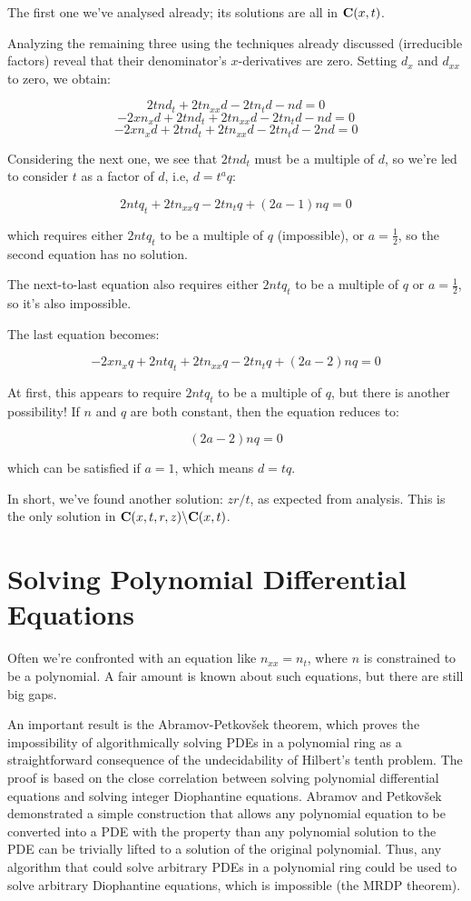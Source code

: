\documentclass{article}
\newcommand{\C}{\ensuremath{{\bf C}}}
\begin{document}
The first one we've analysed already; its solutions are all in $\C(x,t)$.

Analyzing the remaining three using the techniques already discussed
(irreducible factors) reveal that their denominator's $x$-derivatives
are zero.  Setting $d_x$ and $d_{xx}$ to zero, we obtain:

$$2tnd_t +2tn_{xx}d -2tn_td -nd = 0$$
$$-2xn_xd +2tnd_t +2tn_{xx}d -2tn_td -nd = 0$$
$$-2xn_xd +2tnd_t +2tn_{xx}d -2tn_td -2nd = 0$$

Considering the next one, we see that $2tnd_t$ must be a multiple of $d$, so we're led to
consider $t$ as a factor of $d$, i.e, $d=t^a q$:

$$2nt q_t + 2tn_{xx}q -2tn_tq +(2a-1)nq = 0$$

which requires either $2ntq_t$ to be a multiple of $q$ (impossible), or $a=\frac{1}{2}$,
so the second equation has no solution.

The next-to-last equation also requires either $2ntq_t$ to be a multiple of $q$ or $a=\frac{1}{2}$, so it's also impossible.

The last equation becomes:


$$-2xn_xq  + 2 n t q_t +2tn_{xx}q -2tn_tq +(2a-2)nq = 0$$

At first, this appears to require $2ntq_t$ to be a multiple of $q$, but there is another possibility!
If $n$ and $q$ are both constant, then the equation reduces to:

$$(2a-2)nq = 0$$

which can be satisfied if $a=1$, which means $d=tq$.

In short, we've found another solution: $zr/t$, as expected from analysis.
This is the only solution in $\C(x,t,r,z) \backslash \C(x,t)$.

\vfill\eject

\section*{Solving Polynomial Differential Equations}

Often we're confronted with an equation like $n_{xx} = n_t$, where $n$
is constrained to be a polynomial.  A fair amount is known about
such equations, but there are still big gaps.

An important result is the Abramov-Petkov\v sek theorem, which proves
the impossibility of algorithmically solving PDEs in a polynomial ring
as a straightforward consequence of the undecidability of Hilbert's
tenth problem.  The proof is based on the close correlation between
solving polynomial differential equations and solving integer Diophantine
equations.  Abramov and Petkov\v sek demonstrated a simple
construction that allows any polynomial equation to be converted
into a PDE with the property than any polynomial solution to the PDE
can be trivially lifted to a solution of the original polynomial.
Thus, any algorithm that could solve arbitrary PDEs in a polynomial
ring could be used to solve arbitrary Diophantine equations, which
is impossible (the MRDP theorem).
\end{document}
